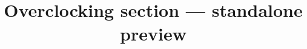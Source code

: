 \documentclass[letterpaper]{article}
\title{Overclocking section --- standalone preview}
\author{}
\begin{document}

\footnotesize


\end{document}
